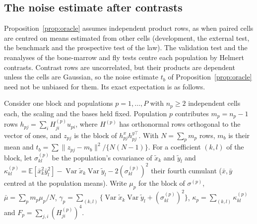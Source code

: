 \subsection*{The noise estimate after contrasts}
Proposition~\ref{prop:oracle} assumes independent product rows, as when paired cells are centred on means estimated from other cells (development, the external test, the benchmark and the prospective test of the law). The validation test and the reanalyses of the bone-marrow and fly tests centre each population by Helmert contrasts. Contrast rows are uncorrelated, but their products are dependent unless the cells are Gaussian, so the noise estimate $t_b$ of Proposition~\ref{prop:oracle} need not be unbiased for them. Its exact expectation is as follows.

Consider one block and populations $p=1,\dots,P$ with $n_p\ge2$ independent cells each, the scaling and the bases held fixed. Population $p$ contributes $m_p=n_p-1$ rows $h_{pj}=\sum_iH^{(p)}_{ji}u_{pi}$, where $H^{(p)}$ has orthonormal rows orthogonal to the vector of ones, and $z_{pj}$ is the block of $h^x_{pj}h^{y\top}_{pj}$. With $N=\sum_pm_p$ rows, $m_b$ is their mean and $t_b=\sum\|z_{pj}-m_b\|^2/\{N(N-1)\}$. For a coefficient $(k,l)$ of the block, let $\sigma^{(p)}_{kl}$ be the population's covariance of $\tilde x_k$ and $\tilde y_l$ and $\kappa^{(p)}_{kl}=\mathbb{E}[\bar x_k^2\bar y_l^2]-\operatorname{Var}\tilde x_k\operatorname{Var}\tilde y_l-2(\sigma^{(p)}_{kl})^2$ their fourth cumulant ($\bar x,\bar y$ centred at the population means). Write $\mu_p$ for the block of $\sigma^{(p)}$, $\bar\mu=\sum_pm_p\mu_p/N$, $\gamma_p=\sum_{(k,l)}\{\operatorname{Var}\tilde x_k\operatorname{Var}\tilde y_l+(\sigma^{(p)}_{kl})^2\}$, $\kappa_p=\sum_{(k,l)}\kappa^{(p)}_{kl}$ and $F_p=\sum_{j,i}(H^{(p)}_{ji})^4$.

